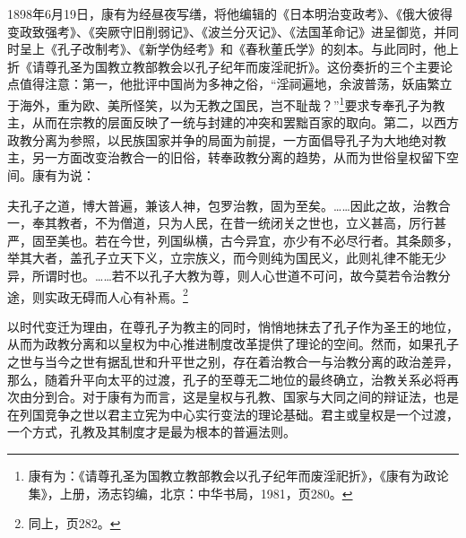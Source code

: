 \documentclass[a4paper, 12pt, openright]{ctexbook}
\renewenvironment{quote}
  {\list{}{\rightmargin2\ccwd \leftmargin2\ccwd \itemindent=2\ccwd \listparindent=2\ccwd}%
   \item\relax\small\kaishu\color{black}}
  {\endlist}
\begin{document}
1898年6月19日，康有为经昼夜写缮，将他编辑的《日本明治变政考》、《俄大彼得变政致强考》、《突厥守旧削弱记》、《波兰分灭记》、《法国革命记》进呈御览，并同时呈上《孔子改制考》、《新学伪经考》和《春秋董氏学》的刻本。与此同时，他上折《请尊孔圣为国教立教部教会以孔子纪年而废淫祀折》。这份奏折的三个主要论点值得注意：第一，他批评中国尚为多神之俗，“淫祠遍地，余波普荡，妖庙繁立于海外，重为欧、美所怪笑，以为无教之国民，岂不耻哉？”\footnote{康有为：《请尊孔圣为国教立教部教会以孔子纪年而废淫祀折》，《康有为政论集》，上册，汤志钧编，北京：中华书局，1981，页280。}要求专奉孔子为教主，从而在宗教的层面反映了一统与封建的冲突和罢黜百家的取向。第二，以西方政教分离为参照，以民族国家并争的局面为前提，一方面倡导孔子为大地绝对教主，另一方面改变治教合一的旧俗，转奉政教分离的趋势，从而为世俗皇权留下空间。康有为说：

\begin{quote}
夫孔子之道，博大普遍，兼该人神，包罗治教，固为至矣。……因此之故，治教合一，奉其教者，不为僧道，只为人民，在昔一统闭关之世也，立义甚高，厉行甚严，固至美也。若在今世，列国纵横，古今异宜，亦少有不必尽行者。其条颇多，举其大者，盖孔子立天下义，立宗族义，而今则纯为国民义，此则礼律不能无少异，所谓时也。……若不以孔子大教为尊，则人心世道不可问，故今莫若令治教分途，则实政无碍而人心有补焉。\footnote{同上，页282。}
\end{quote}

以时代变迁为理由，在尊孔子为教主的同时，悄悄地抹去了孔子作为圣王的地位，从而为政教分离和以皇权为中心推进制度改革提供了理论的空间。然而，如果孔子之世与当今之世有据乱世和升平世之别，存在着治教合一与治教分离的政治差异，那么，随着升平向太平的过渡，孔子的至尊无二地位的最终确立，治教关系必将再次由分到合。对于康有为而言，这是皇权与孔教、国家与大同之间的辩证法，也是在列国竞争之世以君主立宪为中心实行变法的理论基础。君主或皇权是一个过渡，一个方式，孔教及其制度才是最为根本的普遍法则。
\end{document}
